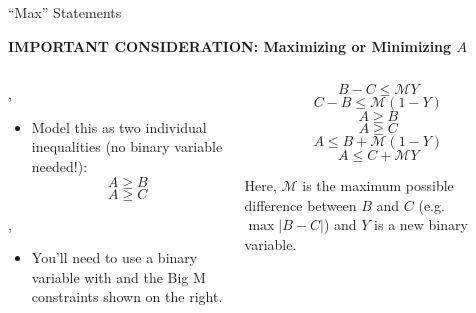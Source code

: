 \documentclass[10pt, aspectratio=169]{beamer}
\begin{document}
\begin{frame}[t]{\enquote{Max} Statements}
    \begin{center}
        \textbf{IMPORTANT CONSIDERATION: Maximizing or Minimizing $A$}
    \end{center}
    \begin{columns}[t]
        \begin{column}[t]{0.5\textwidth}
            \vspace{-.8cm}
            \begin{center}
                ,
                \underbar{}
            \end{center}
            \vspace{-0.4cm}
            \begin{itemize}
                \item Model this as two individual inequalities (no binary variable needed!):
                $$A \geq B$$
                $$A \geq C$$
            \end{itemize}
            \begin{center}
                ,
            \end{center}
            \begin{itemize}
                \item You'll need to use a binary variable with and the Big M constraints shown on the right.
            \end{itemize}
        \end{column}
        \begin{column}[t]{0.5\textwidth}
                $$B - C \leq \mathcal{M} Y$$
                $$C - B \leq \mathcal{M} (1-Y)$$
                $$A \geq B$$
                $$A \geq C$$
                $$A \leq B + \mathcal{M}(1-Y)$$
                $$A \leq C + \mathcal{M}Y$$

                Here, $\mathcal{M}$ is the maximum possible difference between $B$ and $C$ (e.g. $\max{\left|B-C\right|}$) and $Y$ is a new binary variable.
        \end{column}
    \end{columns}
\end{frame}
\end{document}
